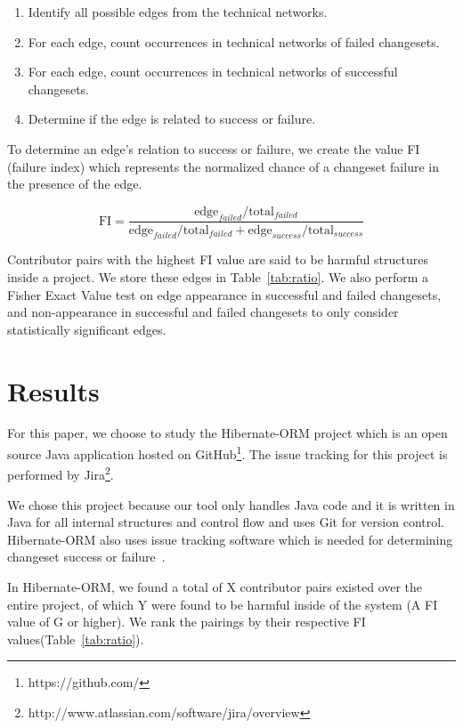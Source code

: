 \documentclass[conference]{IEEEtran}
\begin{document}
\begin{enumerate}
\item Identify all possible edges from the technical networks.
\item For each edge, count occurrences in technical networks of failed changesets.
\item For each edge, count occurrences in technical networks of successful changesets.
\item Determine if the edge is related to success or failure.
\end{enumerate}

To determine an edge's relation to success or failure, we create the value FI (failure
index) which represents the normalized chance of a changeset failure in the presence
of the edge. 

\begin{equation}
\text{FI} = \frac{ \text{edge}_{failed} / \text{total}_{failed}}{\text{edge}_{failed} / \text{total}_{failed} + \text{edge}_{success} / \text{total}_{success}}
\end{equation}

Contributor pairs with the highest FI value are said to be harmful structures
inside a project. We store these edges in Table~\ref{tab:ratio}. We also perform
a Fisher Exact Value test on edge appearance in successful and failed
changesets, and non-appearance in successful and failed changesets to only
consider statistically significant edges. 


\section{Results}
For this paper, we choose to study the Hibernate-ORM project which is an open source Java 
application hosted on GitHub\footnote{https://github.com/}. The issue tracking for this 
project is performed by Jira\footnote{http://www.atlassian.com/software/jira/overview}.

We chose this project because our tool only handles Java code and it is written in Java 
for all internal structures and control flow
and uses Git for version control. Hibernate-ORM also uses issue tracking software which 
is needed for determining changeset success or failure~\cite{Sliwerski:2005:CIF}.

In Hibernate-ORM, we found a total of X contributor pairs existed over the entire project, 
of which Y were found to be harmful inside of the system (A FI value of G or higher). 
We rank the pairings by their respective FI values(Table~\ref{tab:ratio}).
\end{document}
